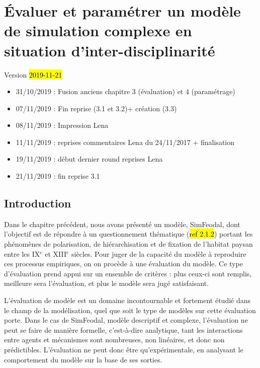 \chapter{Évaluer et paramétrer un modèle de simulation complexe en situation d'inter-disciplinarité}
\label{chap:chap3}
\begin{center}
{\large Version \hl{2019-11-21}}
\end{center}

\begin{itemize}
	\item 31/10/2019 : Fusion anciens chapitre 3 (évaluation) et 4 (paramétrage)
	\item 07/11/2019 : Fin reprise (3.1 et 3.2)+ création (3.3)
	\item 08/11/2019 : Impression Lena
	\item 11/11/2019 : reprises commentaires Lena du 24/11/2017 + finalisation
	\item 19/11/2019 : début dernier round reprises Lena
	\item 21/11/2019 : fin reprise 3.1
\end{itemize}

\setcounter{minitocdepth}{2}

\minitoc
\clearpage

\section*{Introduction}
\label{sec:chap3-4-intro}

Dans le chapitre précédent, nous avons présenté un modèle, SimFeodal, dont l'objectif est de répondre à un questionnement thématique (\hl{ref 2.1.2}) portant les phénomènes de polarisation, de hiérarchisation et de fixation de l'habitat paysan entre les IX$^e$ et XIII$^e$ siècles.
Pour juger de la capacité du modèle à reproduire ces processus empiriques, on on procède à une \og évaluation\fg{} du modèle.
Ce type d'évaluation prend appui sur un ensemble de critères : plus ceux-ci sont remplis, meilleure sera l'évaluation, et plus le modèle sera jugé satisfaisant.

L'évaluation de modèle est un domaine incontournable et fortement étudié dans le champ de la modélisation, quel que soit le type de modèles sur cette évaluation porte.
Dans le cas de SimFeodal, modèle descriptif et complexe, l'évaluation ne peut se faire de manière formelle, c'est-à-dire analytique, tant les interactions entre agents et mécanismes sont nombreuses, non linéaires, et donc non prédictibles.
L'évaluation ne peut donc être qu'expérimentale, en analysant le comportement du modèle sur la base de ses sorties.

